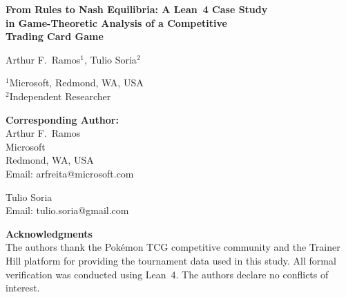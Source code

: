 \documentclass[12pt]{article}
\begin{document}
\begin{center}
{\LARGE\bfseries From Rules to Nash Equilibria: A Lean~4 Case Study\\[0.3em]
in Game-Theoretic Analysis of a Competitive\\[0.3em]
Trading Card Game}

\vspace{2em}

{\large Arthur F.\ Ramos$^{1}$, Tulio Soria$^{2}$}

\vspace{1.5em}

$^{1}$Microsoft, Redmond, WA, USA\\[0.3em]
$^{2}$Independent Researcher

\vspace{2em}

{\bfseries Corresponding Author:}\\[0.5em]
Arthur F.\ Ramos\\
Microsoft\\
Redmond, WA, USA\\
Email: arfreita@microsoft.com

\vspace{1em}

Tulio Soria\\
Email: tulio.soria@gmail.com

\vspace{2em}

{\bfseries Acknowledgments}\\[0.5em]
The authors thank the Pok\'emon TCG competitive community and the Trainer Hill platform for providing the tournament data used in this study. All formal verification was conducted using Lean~4. The authors declare no conflicts of interest.

\end{center}
\end{document}
